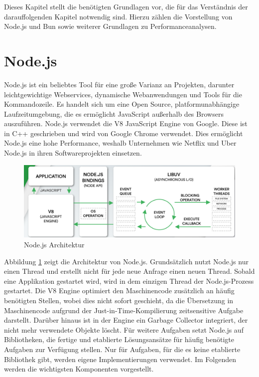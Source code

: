  \label{Grundlagen}
Dieses Kapitel stellt die benötigten Grundlagen vor, die für das Verständnis der darauffolgenden Kapitel notwendig sind. Hierzu zählen die Vorstellung von Node.js und Bun sowie weiterer Grundlagen zu Performanceanalysen.

\section{Node.js} \label{sec:Node.js}
Node.js ist ein beliebtes Tool für eine große Varianz an Projekten, darunter leichtgewichtige Webservices, dynamische Webanwendungen und Tools für die Kommandozeile. Es handelt sich um eine Open Source, platformunabhängige Laufzeitumgebung, die es ermöglicht JavaScript außerhalb des Browsers auszuführen. Node.js verwendet die V8 JavaScript Engine von Google. Diese ist in C++ geschrieben und wird von Google Chrome verwendet. Dies ermöglicht Node.js eine hohe Performance, weshalb Unternehmen wie Netflix und Uber Node.js in ihren Softwareprojekten einsetzen. \cite{OpenJSFoundation.2022} \\

\begin{figure}[h]
	\centering
	\includegraphics[width=\linewidth]{./images/NodeJsArchitecture}
	\caption[Node.js Architektur]{Node.js Architektur \cite{Kaneriya.2022}}
	\label{fig:nodejsArchitecture}
\end{figure}
 
\noindent
Abbildung \ref{fig:nodejsArchitecture} zeigt die Architektur von Node.js. Grundsätzlich nutzt Node.js nur einen Thread und erstellt nicht für jede neue Anfrage einen neuen Thread. Sobald eine Applikation gestartet wird, wird in dem einzigen Thread der Node.js-Prozess gestartet. Die V8 Engine optimiert den Maschinencode zusätzlich an häufig benötigten Stellen, wobei dies nicht sofort geschieht, da die Übersetzung in Maschinencode aufgrund der Just-in-Time-Kompilierung zeitsensitive Aufgabe darstellt. Darüber hinaus ist in der Engine ein Garbage Collector integriert, der nicht mehr verwendete Objekte löscht.  \cite{Springer.2022} \newline 
Für weitere Aufgaben setzt Node.js auf Bibliotheken, die fertige und etablierte Lösungsansätze für häufig benötigte Aufgaben zur Verfügung stellen. Nur für Aufgaben, für die es keine etablierte Bibliothek gibt, werden eigene Implementierungen verwendet. Im Folgenden werden die wichtigsten Komponenten vorgestellt. \cite{Springer.2022} \\

